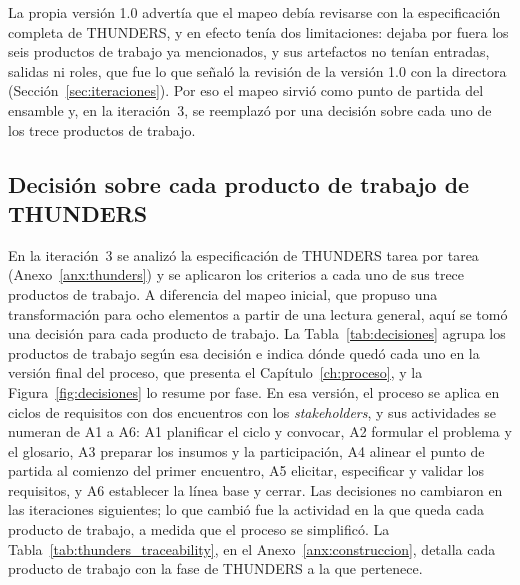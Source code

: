 \documentclass[12pt,letterpaper,oneside]{report}
\begin{document}
La propia versión 1.0 advertía que el mapeo debía revisarse con la
especificación completa de THUNDERS, y en efecto tenía dos limitaciones: dejaba
por fuera los seis productos de trabajo ya mencionados, y sus artefactos no tenían
entradas, salidas ni roles, que fue lo que señaló la revisión de la versión 1.0
con la directora (Sección~\ref{sec:iteraciones}). Por eso el mapeo sirvió como
punto de partida del ensamble y, en la iteración~3, se reemplazó por una
decisión sobre cada uno de los trece productos de trabajo.

\subsection{Decisión sobre cada producto de trabajo de THUNDERS}
\label{sec:decision_componentes}
En la iteración~3 se analizó la especificación de THUNDERS tarea por tarea
(Anexo~\ref{anx:thunders}) y se aplicaron los criterios a cada uno de sus trece
productos de trabajo. A diferencia del mapeo inicial, que propuso una transformación para
ocho elementos a partir de una lectura general, aquí se tomó una decisión para
cada producto de trabajo. La Tabla~\ref{tab:decisiones} agrupa los productos de trabajo según esa
decisión e indica dónde quedó cada uno en la versión final del proceso, que
presenta el Capítulo~\ref{ch:proceso}, y la Figura~\ref{fig:decisiones} lo
resume por fase. En esa versión, el proceso se aplica en ciclos de requisitos con
dos encuentros con los \textit{stakeholders}, y sus actividades se numeran de A1
a A6: A1 planificar el ciclo y convocar, A2 formular el problema y el glosario,
A3 preparar los insumos y la participación, A4 alinear el punto de partida al
comienzo del primer encuentro, A5 elicitar, especificar y validar los
requisitos, y A6 establecer la línea base y cerrar. Las decisiones no cambiaron
en las iteraciones siguientes; lo que cambió fue la actividad en la que queda
cada producto de trabajo, a medida que el proceso se simplificó. La
Tabla~\ref{tab:thunders_traceability}, en el Anexo~\ref{anx:construccion},
detalla cada producto de trabajo con la fase de THUNDERS a la que pertenece.
\end{document}
